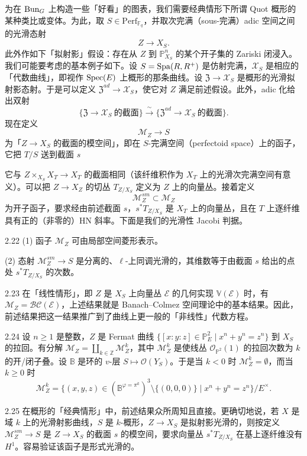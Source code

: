为在 $\operatorname{Bun}_G$ 上构造一些「好看」的图表，我们需要经典情形下所谓 Quot 概形的某种类比或变体。为此，取 $S\in\mathrm{Perf}_{\mathbb F_q}$，并取次完满（sous-完满）adic 空间之间的光滑态射
\[
Z\longrightarrow X_S.
\]
此外作如下「拟射影」假设：存在从 $Z$ 到 $\mathbb P^n_{X_S}$ 的某个开子集的 Zariski 闭浸入。我们可能要考虑的基本例子如下。设 $S=\operatorname{Spa}(R,R^+)$ 是仿射完满，$\mathscr X_S$ 是相应的「代数曲线」，即视作 $\operatorname{Spec}(E)$ 上概形的那条曲线。设 $\mathfrak Z\to\mathscr X_S$ 是概形的光滑拟射影态射。于是可以定义 $\mathfrak Z^{ad}\to\mathscr X_S$，使它对 $Z$ 满足前述假设。此外，adic 化给出双射
\[
\{\mathfrak Z\to\mathscr X_S\ \text{的截面}\}\xrightarrow{\ \sim\ }\{\mathfrak Z^{ad}\to\mathscr X_S\ \text{的截面}\}.
\]
现在定义
\[
\mathcal M_Z\longrightarrow S
\]
为「$Z\to X_S$ 的截面的模空间」，即在 $S$-完满空间（perfectoid space）上的函子，它把 $T/S$ 送到截面 $s$
\begin{center}
\end{center}
它与 $Z\times_{X_S}X_T\to X_T$ 的截面相同（该纤维积作为 $X_T$ 上的光滑次完满空间有意义）。可以把 $Z\to X_Z$ 的切丛 $T_{Z/X_S}$ 定义为 $Z$ 上的向量丛。接着定义
\[
\mathcal M_Z^{sm}\subset\mathcal M_Z
\]
为开子函子，要求经由前述截面 $s$，$s^*T_{Z/X_S}$ 是 $X_T$ 上的向量丛，且在 $T$ 上逐纤维具有正的（非零的）HN 斜率。下面是我们的光滑性 Jacobi 判据。
\begin{thm}{2.22}
(1) 函子 $\mathcal M_Z$ 可由局部空间菱形表示。

(2) 态射 $\mathcal M_Z^{sm}\to S$ 是分离的、$\ell$-上同调光滑的，其维数等于由截面 $s$ 给出的点处 $s^*T_{Z/X_S}$ 的次数。\label{thm:a3-2-22}
\end{thm}
\begin{rem}{2.23}
在「线性情形」，即 $Z$ 是 $X_S$ 上向量丛 $\mathcal E$ 的几何实现 $\mathbb V(\mathcal E)$ 时，有 $\mathcal M_Z=\mathcal{BC}(\mathcal E)$，上述结果就是 Banach--Colmez 空间理论中的基本结果。因此，前述结果把这一结果推广到了曲线上更一般的「非线性」代数方程。\label{rem:a3-2-23}
\end{rem}
\begin{exam}{2.24}
设 $n\ge1$ 是整数，$Z$ 是 Fermat 曲线 $\{[x:y:z]\in\mathbb P^2_E\mid x^n+y^n=z^n\}$ 到 $X_S$ 的拉回。有分解 $\mathcal M_Z=\coprod_{k\in\mathbb Z}\mathcal M^k_Z$，其中 $\mathcal M^k_Z$ 是使线丛 $\mathcal O_{\mathbb P^2}(1)$ 的拉回次数为 $k$ 的开/闭子叠。设 $\mathbb B$ 是环的 $v$-层 $S\mapsto\mathcal O(Y_S)$。于是当 $k<0$ 时 $\mathcal M^k_Z=\emptyset$，而当 $k\ge0$ 时
\[
\mathcal M^k_Z=\{(x,y,z)\in(\mathbb B^{\varphi=\pi^k})^3\setminus\{(0,0,0)\}\mid x^n+y^n=z^n\}/E^\times.
\]
\label{exam:a3-2-24}
\end{exam}
\begin{rem}{2.25}
在概形的「经典情形」中，前述结果众所周知且直接。更确切地说，若 $X$ 是域 $k$ 上的光滑射影曲线，$S$ 是 $k$-概形，$Z\to X_S$ 是拟射影光滑的，则按定义 $\mathcal M_Z^{sm}\to S$ 是 $Z\to X_S$ 的截面 $s$ 的模空间，要求向量丛 $s^*T_{Z/X_S}$ 在基上逐纤维没有 $H^1$。容易验证该函子是形式光滑的。\label{rem:a3-2-25}
\end{rem}

